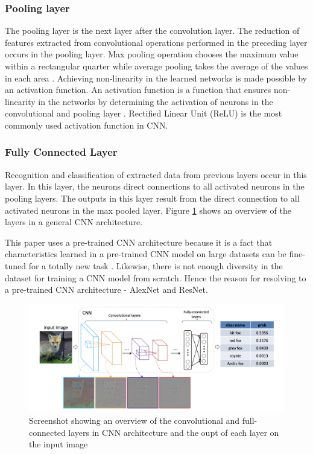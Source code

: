 \documentclass[conference]{IEEEtran}
\begin{document}
\subsubsection{Pooling layer}
The pooling layer is the next layer after the convolution layer. The reduction of features extracted from convolutional operations performed in the preceding layer occurs in the pooling layer. Max pooling operation chooses the maximum value within a rectangular quarter while average pooling takes the average of the values in each area \cite{goodfellow2016deep}.
Achieving non-linearity in the learned networks is made possible by an activation function.
An activation function is a function that ensures non-linearity in the networks by determining the activation of neurons in the convolutional and pooling layer \cite{nielsen2015neural}. Rectified Linear Unit (ReLU) is the most commonly used activation function in CNN.



\subsubsection{Fully Connected Layer}
Recognition and classification of extracted data from previous layers occur in this layer. In this layer, the neurons direct connections to all activated neurons in the pooling layers. The outputs in this layer result from the direct connection to all activated neurons in the max pooled layer. Figure \ref{fig:train_gate} shows an overview of the layers in a general CNN architecture.

This paper uses a pre-trained CNN architecture because it is a fact that characteristics learned in a pre-trained CNN model on large datasets can be fine-tuned for a totally new task \cite{}. Likewise, there is not enough diversity in the dataset for training a CNN model from scratch. Hence the reason for resolving to a pre-trained CNN architecture - AlexNet and ResNet. 


    \begin{figure}[htbp]
        \centerline{\includegraphics[scale=0.25]{figures/Screenshot 2021-11-24 at 14.35.12.png}}
        \caption{Screenshot showing an overview of the convolutional and full-connected layers in CNN architecture and the oupt of each layer on the input image \cite{soderkvist2001computer}}

        \label{fig:train_gate}
    \end{figure}
    
\end{document}

